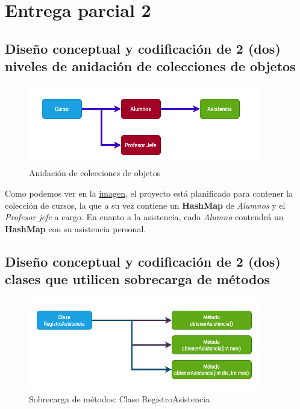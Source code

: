 \section{Entrega parcial 2}

\subsection{Diseño conceptual y codificación de 2 (dos) niveles de anidación de colecciones de objetos}

\begin{figure}[h]
    \centering
    \includegraphics[width=0.9\textwidth]{contents/img/img4}
    \caption{Anidación de colecciones de objetos}
    \label{fig:img4}
\end{figure}

Como podemos ver en la \hyperref[fig:img4]{imagen}, el proyecto está planificado para contener la colección de cursos, la que a su vez contiene un \textbf{HashMap} de \textit{Alumnos} y el \textit{Profesor jefe} a cargo. En cuanto a la asistencia, cada \textit{Alumno} contendrá un \textbf{HashMap} con su asistencia personal.

\subsection{Diseño conceptual y codificación de 2 (dos) clases que utilicen sobrecarga de métodos}

\begin{figure}[h]
    \centering
    \includegraphics[width=0.9\textwidth]{contents/img/img5}
    \caption{Sobrecarga de métodos: Clase RegistroAsistencia}
    \label{fig:img5}
\end{figure}

